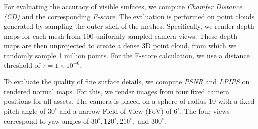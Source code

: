 \documentclass[10pt,twocolumn,letterpaper]{article}
\begin{document}
For evaluating the accuracy of visible surfaces, we compute \emph{Chamfer Distance (CD)} and the corresponding \emph{F-score}. The evaluation is performed on point clouds generated by sampling the outer shell of the meshes. Specifically, we render depth maps for each mesh from 100 uniformly sampled camera views. These depth maps are then unprojected to create a dense 3D point cloud, from which we randomly sample 1 million points. For the F-score calculation, we use a distance threshold of $\tau = 1 \times 10^{-6}$.

To evaluate the quality of fine surface details, we compute \emph{PSNR} and \emph{LPIPS} on rendered normal maps. For this, we render images from four fixed camera positions for all assets. The camera is placed on a sphere of radius 10 with a fixed pitch angle of $30^\circ$ and a narrow Field of View (FoV) of $6^\circ$. The four views correspond to yaw angles of $30^\circ, 120^\circ, 210^\circ,$ and $300^\circ$.
\end{document}
